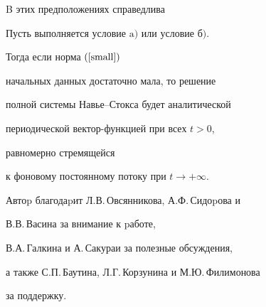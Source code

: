 B этих предположениях справедлива





\begin{thm}


Пусть выполняется условие $\mathrm a)$ или условие $б)$.


Тогда если норма $(\ref{small})$


начальных данных достаточно мала, то решение


полной системы Навье--Стокса будет аналитической


периодической вектор-функцией при всех $t>0$,


равномерно стремящейся


к фоновому постоянному потоку при $t\rightarrow+\infty$.


\end{thm}





Автоp благодаpит Л.В.\,Овсянникова, А.Ф.\,Сидоpова и


В.В.\,Васина за внимание к pаботе,


В.А.\,Галкина и А.\,Сакураи за полезные обсуждения,


а также С.П.\,Баутина, Л.Г.\,Корзунина и М.Ю.\,Филимонова


за поддержку.








